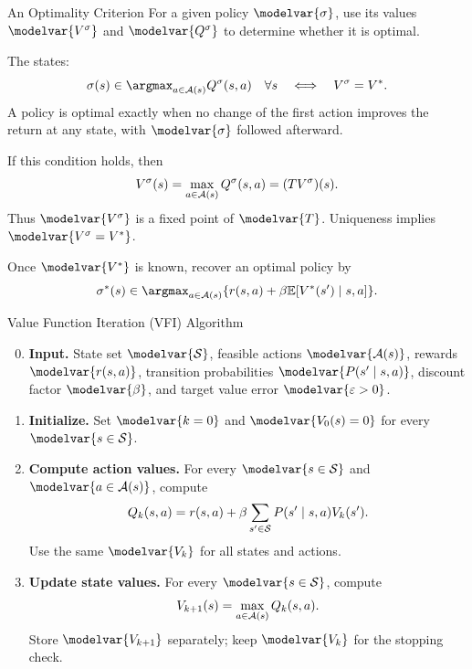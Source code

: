 \begin{frame}{An Optimality Criterion}
\small
For a given policy \(\modelvar{\sigma}\), use its values \(\modelvar{V^\sigma}\) and \(\modelvar{Q^\sigma}\) to determine whether it is optimal.
\par\medskip
The  states:
\[\sigma(s)\in\argmax_{a\in\Aset(s)}Q^\sigma(s,a)\quad\forall s
\quad\Longleftrightarrow\quad V^\sigma=V^*.\]
A policy is optimal exactly when no change of the first action improves the return at any state, with \(\modelvar{\sigma}\) followed afterward.
\par\medskip
If this condition holds, then
\[V^\sigma(s)=\max_{a\in\mathcal A(s)}Q^\sigma(s,a)=(TV^\sigma)(s).\]
Thus \(\modelvar{V^\sigma}\) is a fixed point of \(\modelvar{T}\). Uniqueness implies \(\modelvar{V^\sigma=V^*}\).
\par\medskip
Once \(\modelvar{V^*}\) is known, recover an optimal policy by
\[\sigma^*(s)\in\argmax_{a\in\Aset(s)}\{r(s,a)+\beta\E[V^*(s')\mid s,a]\}.\]
\end{frame}

\begin{frame}{Value Function Iteration (VFI) Algorithm}
\small
\setlength{\abovedisplayskip}{4pt}
\setlength{\belowdisplayskip}{4pt}
\begin{enumerate}
\setcounter{enumi}{-1}
\item \textbf{Input.} State set \(\modelvar{\Sset}\), feasible actions \(\modelvar{\Aset(s)}\), rewards \(\modelvar{r(s,a)}\), transition probabilities \(\modelvar{P(s'\mid s,a)}\), discount factor \(\modelvar{\beta}\), and target value error \(\modelvar{\varepsilon>0}\).
\item \textbf{Initialize.} Set \(\modelvar{k=0}\) and \(\modelvar{V_0(s)=0}\) for every \(\modelvar{s\in\Sset}\).
\item \textbf{Compute action values.} For every \(\modelvar{s\in\Sset}\) and \(\modelvar{a\in\Aset(s)}\), compute
\[Q_k(s,a)=r(s,a)+\beta\sum_{s'\in\mathcal S}P(s'\mid s,a)V_k(s').\]
Use the same \(\modelvar{V_k}\) for all states and actions.
\item \textbf{Update state values.} For every \(\modelvar{s\in\Sset}\), compute
\[V_{k+1}(s)=\max_{a\in\mathcal A(s)}Q_k(s,a).\]
Store \(\modelvar{V_{k+1}}\) separately; keep \(\modelvar{V_k}\) for the stopping check.
\end{enumerate}
\end{frame}

